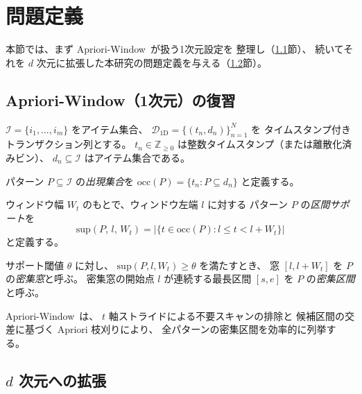 \section{問題定義}\label{sec:problem}

本節では、まず Apriori-Window~\cite{aprioriwindow}が扱う1次元設定を
整理し（\ref{sec:1d_review}節）、
続いてそれを $d$ 次元に拡張した本研究の問題定義を与える（\ref{sec:nd_extension}節）。

\subsection{Apriori-Window（1次元）の復習}\label{sec:1d_review}

$\mathcal{I} = \{i_1, \ldots, i_m\}$ をアイテム集合、
$\mathcal{D}_{\mathrm{1D}} = \{(t_n, d_n)\}_{n=1}^N$ を
タイムスタンプ付きトランザクション列とする。
$t_n \in \mathbb{Z}_{\geq 0}$ は整数タイムスタンプ（または離散化済みビン）、
$d_n \subseteq \mathcal{I}$ はアイテム集合である。

パターン $P \subseteq \mathcal{I}$ の\emph{出現集合}を
$\mathrm{occ}(P) = \{t_n : P \subseteq d_n\}$ と定義する。

\begin{definition}\label{def:sup1d}
ウィンドウ幅 $W_t$ のもとで、ウィンドウ左端 $l$ に対する
パターン $P$ の\emph{区間サポート}を
\[
  \mathrm{sup}(P,\, l,\, W_t)
  = \bigl|\{t \in \mathrm{occ}(P) : l \leq t < l + W_t\}\bigr|
\]
と定義する。
\end{definition}

\begin{definition}\label{def:dense1d}
サポート閾値 $\theta$ に対し、
$\mathrm{sup}(P, l, W_t) \geq \theta$ を満たすとき、
窓 $[l, l+W_t]$ を $P$ の\emph{密集窓}と呼ぶ。
密集窓の開始点 $l$ が連続する最長区間 $[s, e]$ を
$P$ の\emph{密集区間}と呼ぶ。
\end{definition}

Apriori-Window~\cite{aprioriwindow}は、
$t$ 軸ストライドによる不要スキャンの排除と
候補区間の交差に基づく Apriori 枝刈りにより、
全パターンの密集区間を効率的に列挙する。

\subsection{$d$ 次元への拡張}\label{sec:nd_extension}

